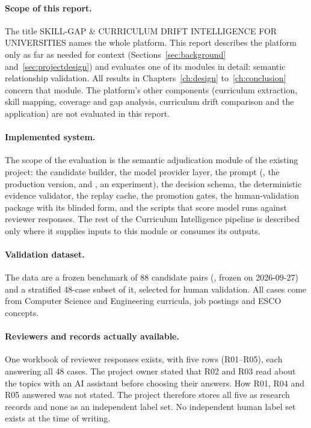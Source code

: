 \paragraph{Scope of this report.} The title SKILL-GAP \& CURRICULUM DRIFT INTELLIGENCE FOR UNIVERSITIES names the whole platform. This report describes the platform only as far as needed for context (Sections~\ref{sec:background} and~\ref{sec:projectdesign}) and evaluates one of its modules in detail: semantic relationship validation. All results in Chapters~\ref{ch:design} to~\ref{ch:conclusion} concern that module. The platform's other components (curriculum extraction, skill mapping, coverage and gap analysis, curriculum drift comparison and the application) are not evaluated in this report.

\paragraph{Implemented system.} The scope of the evaluation is the semantic adjudication module of the existing project: the candidate builder, the model provider layer, the prompt (, the production version, and , an experiment), the decision schema, the deterministic evidence validator, the replay cache, the promotion gates, the human-validation package with its blinded form, and the scripts that score model runs against reviewer responses. The rest of the Curriculum Intelligence pipeline is described only where it supplies inputs to this module or consumes its outputs.

\paragraph{Validation dataset.} The data are a frozen benchmark of 88 candidate pairs (, frozen on 2026-09-27) and a stratified 48-case subset of it, selected for human validation. All cases come from Computer Science and Engineering curricula, job postings and ESCO concepts.

\paragraph{Reviewers and records actually available.} One workbook of reviewer responses exists, with five rows (R01--R05), each answering all 48 cases. The project owner stated that R02 and R03 read about the topics with an AI assistant before choosing their answers. How R01, R04 and R05 answered was not stated. The project therefore stores all five as research records and none as an independent label set. No independent human label set exists at the time of writing.

